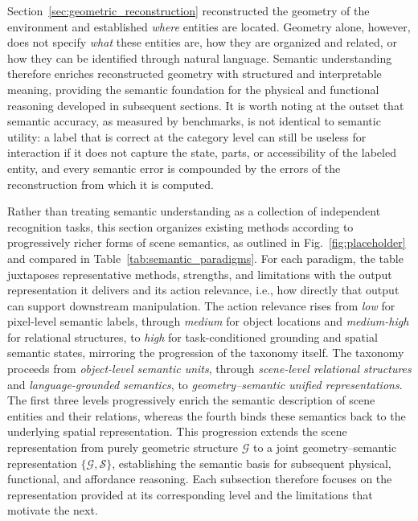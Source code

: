 \documentclass{SCIS2026}
\begin{document}
Section~\ref{sec:geometric_reconstruction} reconstructed the geometry of the environment and established \emph{where} entities are located. Geometry alone, however, does not specify \emph{what} these entities are, how they are organized and related, or how they can be identified through natural language. Semantic understanding therefore enriches reconstructed geometry with structured and interpretable meaning, providing the semantic foundation for the physical and functional reasoning developed in subsequent sections. It is worth noting at the outset that semantic accuracy, as measured by benchmarks, is not identical to semantic utility: a label that is correct at the category level can still be useless for interaction if it does not capture the state, parts, or accessibility of the labeled entity, and every semantic error is compounded by the errors of the reconstruction from which it is computed.

Rather than treating semantic understanding as a collection of independent recognition tasks, this section organizes existing methods according to progressively richer forms of scene semantics, as outlined in Fig.~\ref{fig:placeholder} and compared in Table~\ref{tab:semantic_paradigms}. For each paradigm, the table juxtaposes representative methods, strengths, and limitations with the output representation it delivers and its action relevance, i.e., how directly that output can support downstream manipulation. The action relevance rises from \emph{low} for pixel-level semantic labels, through \emph{medium} for object locations and \emph{medium-high} for relational structures, to \emph{high} for task-conditioned grounding and spatial semantic states, mirroring the progression of the taxonomy itself. The taxonomy proceeds from \emph{object-level semantic units}, through \emph{scene-level relational structures} and \emph{language-grounded semantics}, to \emph{geometry--semantic unified representations}. The first three levels progressively enrich the semantic description of scene entities and their relations, whereas the fourth binds these semantics back to the underlying spatial representation. This progression extends the scene representation from purely geometric structure $\mathcal{G}$ to a joint geometry--semantic representation $\{\mathcal{G},\mathcal{S}\}$, establishing the semantic basis for subsequent physical, functional, and affordance reasoning. Each subsection therefore focuses on the representation provided at its corresponding level and the limitations that motivate the next.
\end{document}
